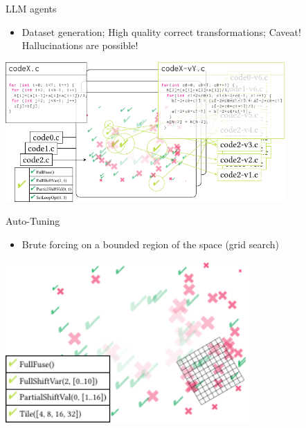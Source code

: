 \documentclass[presentation, aspectratio=169]{beamer}
\begin{document}
\begin{frame}[label={sec:org78ea039}]{LLM agents}
\begin{itemize}
\item Dataset generation; High quality correct transformations; Caveat! Hallucinations are possible!
\end{itemize}
\begin{center}
\includegraphics[width=0.8\textwidth]{./figs/ml-ul.pdf}
\end{center}
\end{frame}
\begin{frame}[label={sec:orgc6cfe5b}]{Auto-Tuning}
\begin{itemize}
\item Brute forcing on a bounded region of the space (grid search)
\end{itemize}
\begin{center}
\includegraphics[width=0.7\textwidth]{./figs/ml-at.pdf}
\end{center}
\end{frame}
\end{document}
